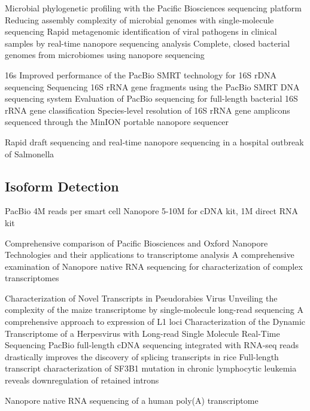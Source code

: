 Microbial phylogenetic profiling with the Pacific Biosciences sequencing platform \cite{Fichot2013}
Reducing assembly complexity of microbial genomes with single-molecule sequencing \cite{Koren2013}
Rapid metagenomic identification of viral pathogens in clinical samples by real-time nanopore sequencing analysis \cite{Greninger2015}
Complete, closed bacterial genomes from microbiomes using nanopore sequencing \cite{Moss2020}

16s
Improved performance of the PacBio SMRT technology for 16S rDNA sequencing \cite{Mosher2014}
Sequencing 16S rRNA gene fragments using the PacBio SMRT DNA sequencing system \cite{Schloss2016}
Evaluation of PacBio sequencing for full-length bacterial 16S rRNA gene classification \cite{Wagner2016}
Species-level resolution of 16S rRNA gene amplicons sequenced through the MinION portable nanopore sequencer \cite{Benitez-Paez2016}

Rapid draft sequencing and real-time nanopore sequencing in a hospital outbreak of Salmonella \cite{Quick2015}




\subsection{Isoform Detection}
\label{subsec:state_of_art:isoform}

PacBio 4M reads per smart cell
Nanopore 5-10M for cDNA kit, 1M direct RNA kit

Comprehensive comparison of Pacific Biosciences and Oxford Nanopore Technologies and their applications to transcriptome analysis \cite{Weirather2017}
A comprehensive examination of Nanopore native RNA sequencing for characterization of complex transcriptomes \cite{Soneson2019}

Characterization of Novel Transcripts in Pseudorabies Virus \cite{Tombacz2015}
Unveiling the complexity of the maize transcriptome by single-molecule long-read sequencing \cite{Wang2016}
A comprehensive approach to expression of L1 loci \cite{Deininger2017}
Characterization of the Dynamic Transcriptome of a Herpesvirus with Long-read Single Molecule Real-Time Sequencing \cite{Tombacz2017}
PacBio full-length cDNA sequencing integrated with RNA-seq reads drastically improves the discovery of splicing transcripts in rice \cite{Zhang2019a}
Full-length transcript characterization of SF3B1 mutation in chronic lymphocytic leukemia reveals downregulation of retained introns \cite{Tang2020}

Nanopore native RNA sequencing of a human poly(A) transcriptome \cite{Workman2019}

